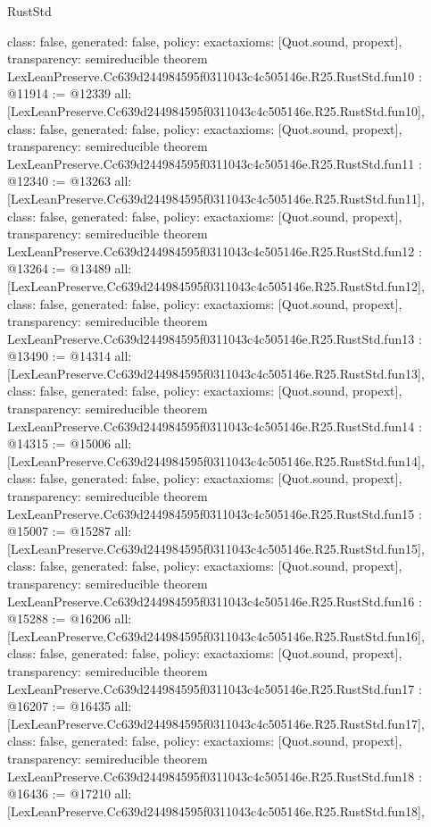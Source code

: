 \begin{lexlean}{RustStd}
\begin{coremodule}
{  class: false,
  generated: false,
  policy: exact{axioms: [Quot.sound, propext]},
  transparency: semireducible
}
theorem LexLeanPreserve.Cc639d244984595f0311043c4c505146e.R25.RustStd.fun10 : @11914 := @12339 {
  all: [LexLeanPreserve.Cc639d244984595f0311043c4c505146e.R25.RustStd.fun10],
  class: false,
  generated: false,
  policy: exact{axioms: [Quot.sound, propext]},
  transparency: semireducible
}
theorem LexLeanPreserve.Cc639d244984595f0311043c4c505146e.R25.RustStd.fun11 : @12340 := @13263 {
  all: [LexLeanPreserve.Cc639d244984595f0311043c4c505146e.R25.RustStd.fun11],
  class: false,
  generated: false,
  policy: exact{axioms: [Quot.sound, propext]},
  transparency: semireducible
}
theorem LexLeanPreserve.Cc639d244984595f0311043c4c505146e.R25.RustStd.fun12 : @13264 := @13489 {
  all: [LexLeanPreserve.Cc639d244984595f0311043c4c505146e.R25.RustStd.fun12],
  class: false,
  generated: false,
  policy: exact{axioms: [Quot.sound, propext]},
  transparency: semireducible
}
theorem LexLeanPreserve.Cc639d244984595f0311043c4c505146e.R25.RustStd.fun13 : @13490 := @14314 {
  all: [LexLeanPreserve.Cc639d244984595f0311043c4c505146e.R25.RustStd.fun13],
  class: false,
  generated: false,
  policy: exact{axioms: [Quot.sound, propext]},
  transparency: semireducible
}
theorem LexLeanPreserve.Cc639d244984595f0311043c4c505146e.R25.RustStd.fun14 : @14315 := @15006 {
  all: [LexLeanPreserve.Cc639d244984595f0311043c4c505146e.R25.RustStd.fun14],
  class: false,
  generated: false,
  policy: exact{axioms: [Quot.sound, propext]},
  transparency: semireducible
}
theorem LexLeanPreserve.Cc639d244984595f0311043c4c505146e.R25.RustStd.fun15 : @15007 := @15287 {
  all: [LexLeanPreserve.Cc639d244984595f0311043c4c505146e.R25.RustStd.fun15],
  class: false,
  generated: false,
  policy: exact{axioms: [Quot.sound, propext]},
  transparency: semireducible
}
theorem LexLeanPreserve.Cc639d244984595f0311043c4c505146e.R25.RustStd.fun16 : @15288 := @16206 {
  all: [LexLeanPreserve.Cc639d244984595f0311043c4c505146e.R25.RustStd.fun16],
  class: false,
  generated: false,
  policy: exact{axioms: [Quot.sound, propext]},
  transparency: semireducible
}
theorem LexLeanPreserve.Cc639d244984595f0311043c4c505146e.R25.RustStd.fun17 : @16207 := @16435 {
  all: [LexLeanPreserve.Cc639d244984595f0311043c4c505146e.R25.RustStd.fun17],
  class: false,
  generated: false,
  policy: exact{axioms: [Quot.sound, propext]},
  transparency: semireducible
}
theorem LexLeanPreserve.Cc639d244984595f0311043c4c505146e.R25.RustStd.fun18 : @16436 := @17210 {
  all: [LexLeanPreserve.Cc639d244984595f0311043c4c505146e.R25.RustStd.fun18],
}
\end{coremodule}
\end{lexlean}
